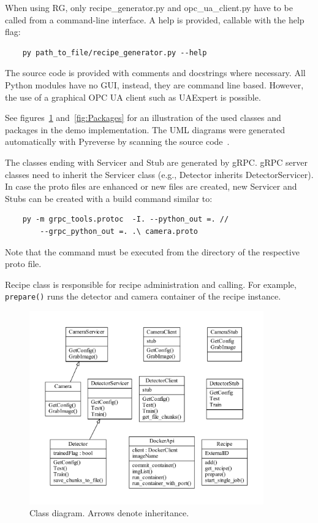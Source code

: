 When using RG, only recipe\_generator.py and opc\_ua\_client.py have to be called from a command-line interface. A help is provided, callable with the help flag:

\begin{verbatim}
    py path_to_file/recipe_generator.py --help
\end{verbatim}

The source code is provided with comments and docstrings where necessary. All Python modules have no GUI, instead, they are command line based. However, the use of a graphical OPC UA client such as UAExpert is possible. 

See figures~\ref{fig:Classes} and~\ref{fig:Packages} for an illustration of the used classes and packages in the demo implementation. The UML diagrams were generated automatically with Pyreverse by scanning the source code~\cite{Anclin2008Pyreverse2019}.

The classes ending with Servicer and Stub are generated by gRPC. gRPC server classes need to inherit the Servicer class (e.g., Detector inherits DetectorServicer). In case the proto files are enhanced or new files are created, new Servicer and Stubs can be created with a build command similar to:

\begin{verbatim}
    py -m grpc_tools.protoc  -I. --python_out =. //
        --grpc_python_out =. .\ camera.proto
\end{verbatim}

Note that the command must be executed from the directory of the respective proto file. 

Recipe class is responsible for recipe administration and calling. For example, \texttt{prepare()} runs the detector and camera container of the recipe instance.
\begin{figure}[ht]
	\centering
  \includegraphics[width=0.9\textwidth]{img/classes.pdf}
	\caption[Class diagram]{Class diagram. Arrows denote inheritance.}
	\label{fig:Classes}
\end{figure}


